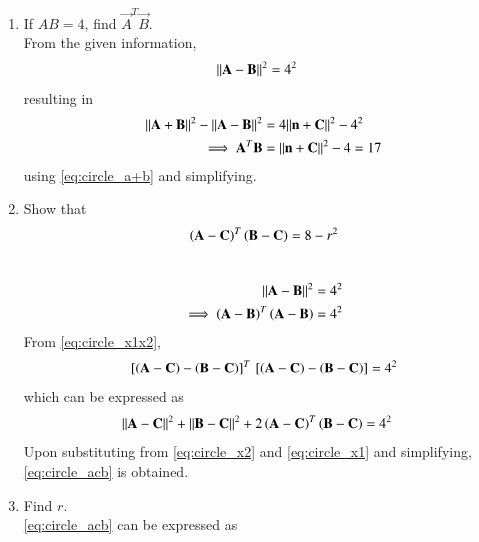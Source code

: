 \documentclass[journal,12pt,twocolumn]{IEEEtran}
\renewcommand\thesection{\arabic{section}}
\begin{document}
\begin{enumerate}[label=\thesection.\arabic*
,ref=\thesection.\theenumi]
\begin{align}
\\
\implies \vec{n}^T\vec{A}+\vec{n}^T\vec{B}-2\vec{n}^T\vec{C} &= k\vec{n}^T\vec{n}
\\
\implies \frac{\vec{n}^T\vec{A}+\vec{n}^T\vec{B}-2\vec{n}^T\vec{C}}{\vec{n}^T\vec{n}} &= k
\\
\implies k &= 2
\end{align}
using \eqref{eq:circle_abtangent}.
Substituting in \eqref{eq:circle_abkn}
\begin{align}
\vec{A}+\vec{B} &= 2\brak{\vec{n}+\vec{C}}
\label{eq:circle_a+b}
\end{align}
%
\item If $AB = 4$, find $\vec{A}^T\vec{B}$.
%
\\
\solution From the given information,
\begin{align}
\lVert\mathbf{A}-\mathbf{B}\rVert^2 &= 4^2
\end{align}
resulting in
\begin{align}
\lVert\mathbf{A}+\mathbf{B}\rVert^2-\lVert\mathbf{A}-\mathbf{B}\rVert^2 &= 4\lVert\mathbf{n}+\mathbf{C}\rVert^2-4^2
\\
\implies\mathbf{A}^T\mathbf{B} &= \lVert\mathbf{n}+\mathbf{C}\rVert^2-4 = 17
\end{align}
using \eqref{eq:circle_a+b} and simplifying.
%
\item Show that
\begin{equation}
\label{eq:circle_acb}
\left(\mathbf{A}-\mathbf{C}\right)^T\left(\mathbf{B}-\mathbf{C}\right) =8 - r^2
\end{equation}
\\
\solution
\begin{align}
\lVert\mathbf{A}-\mathbf{B}\rVert^2 &= 4^2
\\
\implies\left(\mathbf{A}-\mathbf{B}\right)^T\left( \mathbf{A}-\mathbf{B} \right) &= 4^2
\label{eq:circle_x1x2}
\end{align}
%
From \eqref{eq:circle_x1x2},
\begin{align}
{}\left[\left(\mathbf{A}-\mathbf{C}\right)-\left(\mathbf{B}- \mathbf{C}\right)\right]^T{}\left[ 
\left(\mathbf{A}-\mathbf{C}\right)-\left(\mathbf{B}- \mathbf{C}\right)\right] = 4^2
\end{align}
%
which can be expressed as
\begin{align}
\lVert\mathbf{A}-\mathbf{C}\rVert^2+\lVert\mathbf{B}-\mathbf{C}\rVert^2 &
+ 2\left(\mathbf{A}-\mathbf{C}\right)^T\left(\mathbf{B}-\mathbf{C}\right) 
= 4^2
\end{align}
Upon substituting from \eqref{eq:circle_x2} and  \eqref{eq:circle_x1} and simplifying, \eqref{eq:circle_acb}
is obtained.
\item Find $r$.
\\
\solution \eqref{eq:circle_acb} can be expressed as

\end{enumerate}
\end{document}
